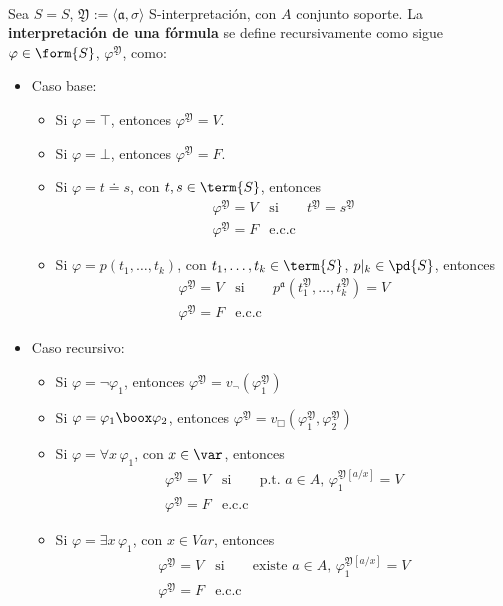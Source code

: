\paragraph{}
\begin{definition}
Sea $S = \si{S}$, $\mathfrak{Y} := \langle \mathfrak{a}, \sigma \rangle$ S-interpretación, con $A$ conjunto soporte. La \textbf{interpretación de una fórmula} se define recursivamente como sigue $\varphi \in \form{S}$, $\varphi^{\mathfrak{Y}}$, como:
\begin{itemize}
    \item Caso base:
        \begin{itemize}
            \item Si $\varphi = \top$, entonces $\varphi^{\mathfrak{Y}} = V$.
            \item Si $\varphi = \bot$, entonces $\varphi^{\mathfrak{Y}} = F$.
            \item Si $\varphi = t \doteq s$, con $t, s \in \term{S}$, entonces 
\[ \begin{matrix}
\varphi^{\mathfrak{Y}} = V & \mbox{si} & t^{\mathfrak{Y}} = s^{\mathfrak{Y}}\\
\varphi^{\mathfrak{Y}} = F & \mbox{e.c.c} 
\end{matrix} \]            
            \item Si $\varphi = p(t_1, \dots, t_k)$, con $t_1, \dots, t_k \in \term{S}$, $p\vert_k \in \pd{S}$, entonces 
            \[ \begin{matrix}
\varphi^{\mathfrak{Y}} = V & \mbox{si} &p^{\mathfrak{a}}(t_{1}^{\mathfrak{Y}}, \dots, t_{k}^{\mathfrak{Y}}) = V\\
\varphi^{\mathfrak{Y}} = F & \mbox{e.c.c} 
\end{matrix} \]  
        \end{itemize}
    \item Caso recursivo:
        \begin{itemize}
            \item Si $\varphi = \neg \varphi_1$, entonces  $\varphi^{\mathfrak{Y}} = v_{\neg}(\varphi_{1}^{\mathfrak{Y}})$
            \item Si $\varphi = \varphi_1 \boox \varphi_2$, entonces $\varphi^{\mathfrak{Y}} = v_{\Box}(\varphi_{1}^{\mathfrak{Y}}, \varphi_{2}^{\mathfrak{Y}})$
            \item Si $\varphi = \forall x \, \varphi_1$, con $x \in \var$, entonces 
            \[ \begin{matrix}
\varphi^{\mathfrak{Y}} = V & \mbox{si} & \mbox{p.t. } a \in A, \, \varphi_1^{\mathfrak{Y}[a/x]} = V\\
\varphi^{\mathfrak{Y}} = F & \mbox{e.c.c} 
\end{matrix} \]  
            \item Si $\varphi = \exists x \, \varphi_1$, con $x \in Var$, entonces
            \[ \begin{matrix}
\varphi^{\mathfrak{Y}} = V & \mbox{si} & \mbox{existe } a \in A, \, \varphi_1^{\mathfrak{Y}[a/x]} = V\\
\varphi^{\mathfrak{Y}} = F & \mbox{e.c.c} 
\end{matrix} \]   
        \end{itemize}
\end{itemize}
\end{definition}